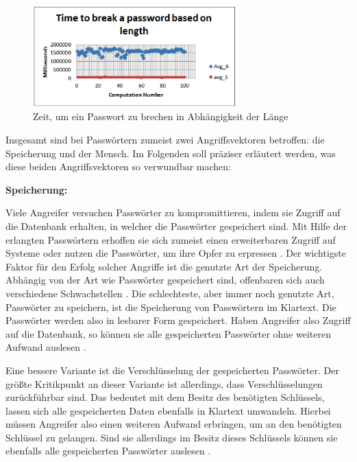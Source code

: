     \begin{figure}[H]
        \centering 
        \includegraphics[width=0.7\textwidth]{img/abbildungen/length-time.png}
        \captionsetup{format=hang}
        \caption{Zeit, um ein Passwort zu brechen in Abhängigkeit der Länge \cite{chanda2016password}} \label{timetobreak}
    \end{figure}

    Insgesamt sind bei Passwörtern zumeist zwei Angriffsvektoren betroffen: die Speicherung und der Mensch. Im Folgenden soll präziser erläutert werden, was diese beiden Angriffsvektoren so verwundbar machen:

    \textbf{Speicherung:}

    Viele Angreifer versuchen Passwörter zu kompromittieren, indem sie Zugriff auf die Datenbank erhalten, in welcher die Passwörter gespeichert sind. Mit Hilfe der erlangten Passwörtern erhoffen sie sich zumeist einen erweiterbaren Zugriff auf Systeme oder nutzen die Passwörter, um ihre Opfer zu erpressen \cite{boonkrong2012security}. Der wichtigste Faktor für den Erfolg solcher Angriffe ist die genutzte Art der Speicherung. Abhängig von der Art wie Passwörter gespeichert sind, offenbaren sich auch verschiedene Schwachstellen \cite{chanda2016password}.
    Die schlechteste, aber immer noch genutzte Art, Passwörter zu speichern, ist die Speicherung von Passwörtern im Klartext. Die Passwörter werden also in lesbarer Form gespeichert. Haben Angreifer also Zugriff auf die Datenbank, so können sie alle gespeicherten Passwörter ohne weiteren Aufwand auslesen \cite{chanda2016password}.

    Eine bessere Variante ist die Verschlüsselung der gespeicherten Passwörter. Der größte Kritikpunkt an dieser Variante ist allerdings, dass Verschlüsselungen zurückführbar sind. Das bedeutet mit dem Besitz des benötigten Schlüssels, lassen sich alle gespeicherten Daten ebenfalls in Klartext umwandeln. Hierbei müssen Angreifer also einen weiteren Aufwand erbringen, um an den benötigten Schlüssel zu gelangen. Sind sie allerdings im Besitz dieses Schlüssels können sie ebenfalls alle gespeicherten Passwörter auslesen \cite{chanda2016password}. 

